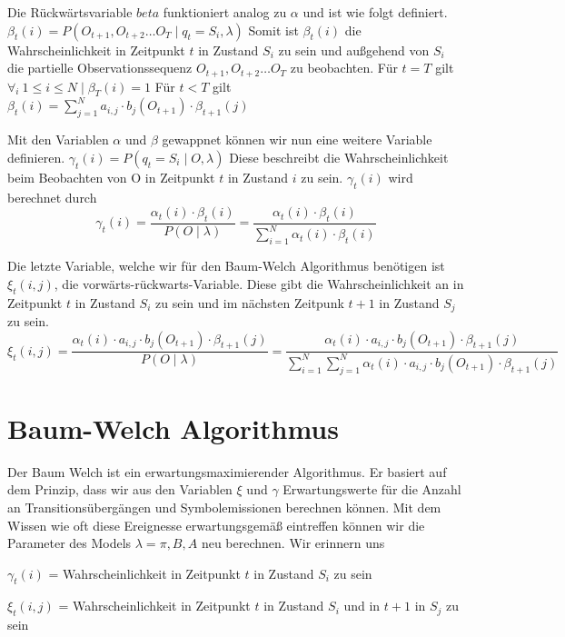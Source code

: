 Die Rückwärtsvariable $beta$ funktioniert analog zu $\alpha$ und ist wie folgt definiert.
$\beta_t(i) = P(O_{t+1}, O_{t+2} \dots O_T \mid q_t = S_i, \lambda)$
Somit ist $\beta_t(i)$ die Wahrscheinlichkeit in Zeitpunkt $t$ in Zustand $S_i$ zu sein
und außgehend von $S_i$ die partielle Observationssequenz $O_{t+1}, O_{t+2} \dots O_T$
zu beobachten.
Für $t = T$ gilt
$\forall_i \  1 \leq i \leq N \mid \beta_T(i) = 1  $
Für $t < T$ gilt
$\beta_t(i) = \sum_{j=1}^{N} a_{i,j} \cdot b_j(O_{t+1}) \cdot \beta_{t+1}(j)$

Mit den Variablen $\alpha$ und $\beta$ gewappnet können wir nun eine weitere Variable definieren.
$\gamma_t(i) = P(q_t = S_i \mid O, \lambda)$
Diese beschreibt die Wahrscheinlichkeit beim Beobachten von O in Zeitpunkt $t$ in Zustand $i$
zu sein. $\gamma_t(i)$ wird berechnet durch
\begin{equation}
\gamma_t(i)
= \frac{\alpha_t(i) \cdot \beta_t(i)}{P(O \mid \lambda)}
= \frac{\alpha_t(i) \cdot \beta_t(i)}{\sum_{i=1}^{N} \alpha_t(i) \cdot \beta_t(i)}
\end{equation}

Die letzte Variable, welche wir für den Baum-Welch Algorithmus benötigen ist
$\xi_t(i, j)$, die vorwärts-rückwarts-Variable.
Diese gibt die Wahrscheinlichkeit an in Zeitpunkt $t$ in Zustand $S_i$ zu sein
und im nächsten Zeitpunk $t+1$ in Zustand $S_j$ zu sein.
\begin{equation}
\xi_t(i, j)
= \frac{\alpha_t(i) \cdot a_{i,j} \cdot b_j(O_{t+1}) \cdot \beta_{t+1}(j)}{P(O \mid \lambda)}
= \frac{\alpha_t(i) \cdot a_{i,j} \cdot b_j(O_{t+1}) \cdot \beta_{t+1}(j)}
        {\sum_{i=1}^{N} \sum_{j=1}^{N} \alpha_t(i) \cdot a_{i,j} \cdot b_j(O_{t+1}) \cdot \beta_{t+1}(j)}
\end{equation}


\section{Baum-Welch Algorithmus}
Der Baum Welch ist ein erwartungsmaximierender Algorithmus.
Er basiert auf dem Prinzip, dass wir aus den Variablen $\xi$ und $\gamma$
Erwartungswerte für die Anzahl an Transitionsübergängen und Symbolemissionen berechnen können.
Mit dem Wissen wie oft diese Ereignesse erwartungsgemäß eintreffen können wir
die Parameter des Models $\lambda = \pi, B, A$ neu berechnen.
Wir erinnern uns

$\gamma_t(i)$ = Wahrscheinlichkeit in Zeitpunkt $t$ in Zustand $S_i$ zu sein

$\xi_t(i, j)$ = Wahrscheinlichkeit in Zeitpunkt $t$ in Zustand $S_i$ und in $t+1$ in $S_j$ zu sein

